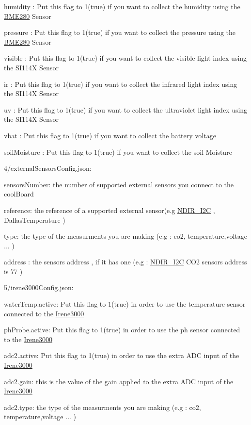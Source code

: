 humidity \+: Put this flag to 1(true) if you want to collect the humidity using the \hyperlink{class_b_m_e280}{B\+M\+E280} Sensor

pressure \+: Put this flag to 1(true) if you want to collect the pressure using the \hyperlink{class_b_m_e280}{B\+M\+E280} Sensor

visible \+: Put this flag to 1(true) if you want to collect the visible light index using the S\+I114X Sensor

ir \+: Put this flag to 1(true) if you want to collect the infrared light index using the S\+I114X Sensor

uv \+: Put this flag to 1(true) if you want to collect the ultraviolet light index using the S\+I114X Sensor

vbat \+: Put this flag to 1(true) if you want to collect the battery voltage

soil\+Moisture \+: Put this flag to 1(true) if you want to collect the soil Moisture

4/external\+Sensors\+Config.\+json\+:

sensors\+Number\+: the number of supported external sensors you connect to the cool\+Board

reference\+: the reference of a supported external sensor(e.\+g \hyperlink{class_n_d_i_r___i2_c}{N\+D\+I\+R\+\_\+\+I2C} , Dallas\+Temperature )

type\+: the type of the measurments you are making (e.\+g \+: co2, temperature,voltage ... )

address \+: the sensor\textquotesingle{}s address , if it has one (e.\+g \+: \hyperlink{class_n_d_i_r___i2_c}{N\+D\+I\+R\+\_\+\+I2C} C\+O2 sensor\textquotesingle{}s address is 77 )

5/irene3000\+Config.\+json\+:

water\+Temp.\+active\+: Put this flag to 1(true) in order to use the temperature sensor connected to the \hyperlink{class_irene3000}{Irene3000}

ph\+Probe.\+active\+: Put this flag to 1(true) in order to use the ph sensor connected to the \hyperlink{class_irene3000}{Irene3000}

adc2.\+active\+: Put this flag to 1(true) in order to use the extra A\+DC input of the \hyperlink{class_irene3000}{Irene3000}

adc2.\+gain\+: this is the value of the gain applied to the extra A\+DC input of the \hyperlink{class_irene3000}{Irene3000}

adc2.\+type\+: the type of the measurments you are making (e.\+g \+: co2, temperature,voltage ... )

